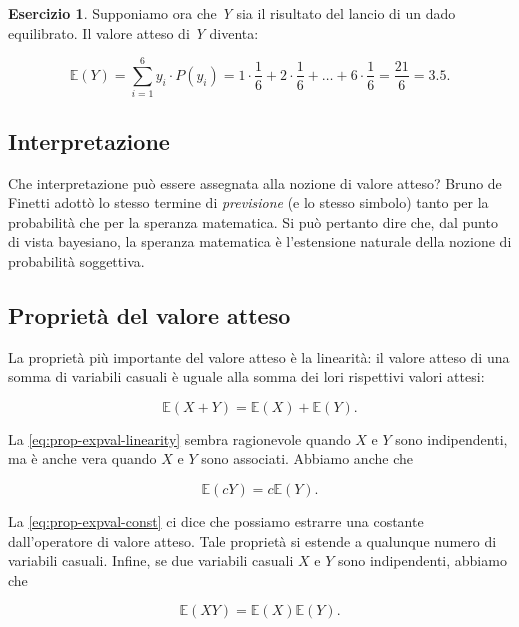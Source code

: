 \documentclass[
  11pt,
]{krantz}
\newcommand{\E}{\mathbb{E}} %
\theoremstyle{definition}
\theoremstyle{definition}
\theoremstyle{definition}
\newtheorem{exercise}{Esercizio}[chapter]
\theoremstyle{definition}
\theoremstyle{remark}
\begin{document}
\begin{exercise}
Supponiamo ora che \emph{Y} sia il risultato del lancio di un dado equilibrato. Il valore atteso di \emph{Y} diventa:

\[
\E(Y) = \sum_{i=1}^{6} y_i \cdot P(y_i) = 1 \cdot \frac{1}{6} + 2 \cdot \frac{1}{6} + \dots + 6 \cdot \frac{1}{6} = \frac{21}{6} = 3.5.
\]
\end{exercise}

\hypertarget{interpretazione}{%
\subsection{Interpretazione}\label{interpretazione}}

Che interpretazione può essere assegnata alla nozione di valore atteso? Bruno de Finetti adottò lo stesso termine di \emph{previsione} (e lo stesso simbolo) tanto per la probabilità che per la speranza matematica. Si può pertanto dire che, dal punto di vista bayesiano, la speranza matematica è l'estensione naturale della nozione di probabilità soggettiva.

\hypertarget{proprietuxe0-del-valore-atteso}{%
\subsection{Proprietà del valore atteso}\label{proprietuxe0-del-valore-atteso}}

La proprietà più importante del valore atteso è la linearità: il valore atteso di una somma di variabili casuali è uguale alla somma dei lori rispettivi valori attesi:

\begin{equation}
\E(X + Y) = \E(X) + \E(Y).
\label{eq:prop-expval-linearity}
\end{equation}

La \eqref{eq:prop-expval-linearity} sembra ragionevole quando \(X\) e \(Y\) sono indipendenti, ma è anche vera quando \(X\) e \(Y\) sono associati. Abbiamo anche che

\begin{equation}
\E(cY) = c \E(Y).
\label{eq:prop-expval-const}
\end{equation}

La \eqref{eq:prop-expval-const} ci dice che possiamo estrarre una costante dall'operatore di valore atteso. Tale proprietà si estende a qualunque numero di variabili casuali. Infine, se due variabili casuali \(X\) e \(Y\) sono indipendenti, abbiamo che

\begin{equation}
\E(X Y) = \E(X) \E(Y). 
\label{eq:expval-prod-ind-rv}
\end{equation}
\end{document}
